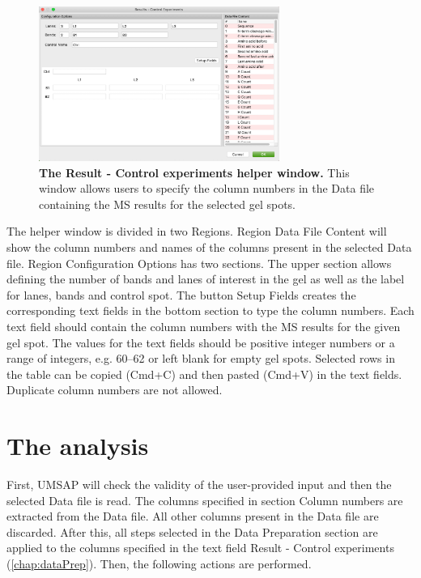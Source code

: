 \begin{figure}[h]
    \centering
    \includegraphics[width=0.7\textwidth]{./IMAGES/MOD-LIMPROT/limprot-rescontrol.jpg}
    \caption[The Result - Control experiments helper window]{\textbf{The Result -
    Control experiments helper window.} This window allows users to specify the column
    numbers in the Data file containing the MS results for the selected gel spots.} 
    \label{fig:limprotResControlWindow}
    \vspace{-5pt} 	
\end{figure}

The helper window is divided in two Regions. Region Data File Content will show the 
column numbers and names of the columns present in the selected Data file. Region
Configuration Options has two sections. The upper section allows defining the number
of bands and lanes of interest in the gel as well as the label for lanes, bands and
control spot. The button Setup Fields creates the corresponding text fields in the
bottom section to type the column numbers. Each text field should contain the column
numbers with the MS results for the given gel spot. The values for the text fields
should be positive integer numbers or a range of integers, e.g. 
\numrange[range-phrase=--]{60}{62} or left blank for empty gel spots. Selected rows
in the table can be copied (Cmd+C) and then pasted (Cmd+V) in the text fields. 
Duplicate column numbers are not allowed. 

\section{The analysis}
\label{sec:limprotEquivalenceTest}
First, UMSAP will check the validity of the user-provided input and then the selected
Data file is read. The columns specified in section Column numbers are extracted
from the Data file. All other columns present in the Data file are discarded. After
this, all steps selected in the Data Preparation section are applied to the columns
specified in the text field Result - Control experiments (\autoref{chap:dataPrep}).
Then, the following actions are performed.


